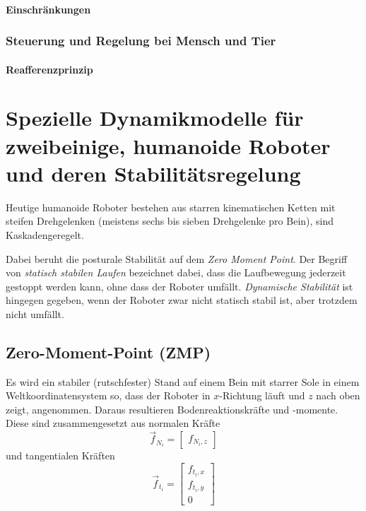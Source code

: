 				\paragraph{Einschränkungen} %

			\subsubsection{Steuerung und Regelung bei Mensch und Tier} %

				\paragraph{Reafferenzprinzip} %

	\section{Spezielle Dynamikmodelle für zweibeinige, humanoide Roboter und deren Stabilitätsregelung}
		Heutige humanoide Roboter bestehen aus starren kinematischen Ketten mit steifen Drehgelenken (meistens sechs bis sieben Drehgelenke pro Bein), sind Kaskadengeregelt.
		
		Dabei beruht die posturale Stabilität auf dem \emph{Zero Moment Point}. Der Begriff von \emph{statisch stabilen Laufen} bezeichnet dabei, dass die Laufbewegung jederzeit gestoppt werden kann, ohne dass der Roboter umfällt. \emph{Dynamische Stabilität} ist hingegen gegeben, wenn der Roboter zwar nicht statisch stabil ist, aber trotzdem nicht umfällt.

		\subsection{Zero-Moment-Point (ZMP)}
			Es wird ein stabiler (rutschfester) Stand auf einem Bein mit starrer Sole in einem Weltkoordinatensystem so, dass der Roboter in \(x\)-Richtung läuft und \(z\) nach oben zeigt, angenommen. Daraus resultieren Bodenreaktionskräfte und -momente. Diese sind zusammengesetzt aus normalen Kräfte
			\begin{equation*}
				\vec{f}_{N_i} =
					\begin{bmatrix}
						f_{N_i, z}
					\end{bmatrix}
			\end{equation*}
			und tangentialen Kräften
			\begin{equation*}
				\vec{f}_{t_i} =
					\begin{bmatrix}
						f_{t_i, x} \\
						f_{t_i, y} \\
						0
					\end{bmatrix}
			\end{equation*}
			
